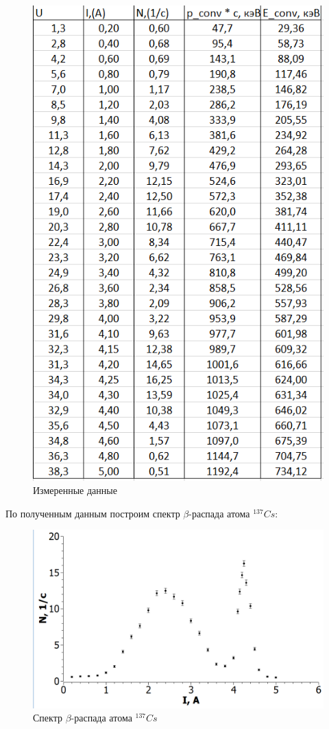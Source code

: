 \documentclass[a4paper, 12pt]{article}%
\begin{document}
\begin{enumerate}
\begin{figure}[h]
    \centering
    \includegraphics[width=0.8\linewidth]{table_1.PNG}
    \caption{Измеренные данные}
    \label{fig:table_1}
\end{figure}

По полученным данным построим спектр $\beta$-распада атома $^{137}Cs$:

\begin{figure}[h]
    \centering
    \includegraphics[width=0.8\linewidth]{graph_1.PNG}
    \caption{Спектр $\beta$-распада атома $^{137}Cs$}
    \label{fig:graph_1}
\end{figure}


\end{enumerate}
\end{document}
